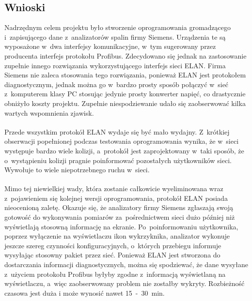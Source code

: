 \subsection{Wnioski}
Nadrzędnym celem projektu było stworzenie oprogramowania gromadzącego i~zapisującego dane z~analizatorów spalin firmy Siemens. Urządzenia te są wyposażone w~dwa interfejsy komunikacyjne, w~tym sugerowany przez producenta interfejs protokołu Profibus. Zdecydowano się jednak na zastosowanie zupełnie innego rozwiązania wykorzystującego interfejs sieci ELAN. Firma Siemens nie zaleca stosowania tego rozwiązania, ponieważ ELAN jest protokołem diagnostycznym, jednak można go w~bardzo prosty sposób połączyć w~sieć z~komputerem klasy PC stosując jedynie prosty konwerter napięć, co drastycznie obniżyło koszty projektu. Zupełnie niespodziewanie udało się zaobserwować kilka wartych wspomnienia zjawisk.
\\ \\
Przede wszystkim protokół ELAN wydaje się być mało wydajny. Z~krótkiej obserwacji popełnionej podczas testowania oprogramowania wynika, że w~sieci występuje bardzo wiele kolizji, a~protokół jest zaprojektowany w~taki sposób, że o~wystąpieniu kolizji pragnie poinformować pozostałych użytkowników sieci. Wywołuje to wiele niepotrzebnego ruchu w~sieci.
\\ \\
Mimo tej niewielkiej wady, która zostanie całkowicie wyeliminowana wraz z~pojawieniem się kolejnej wersji oprogramowania, protokół ELAN posiada nieocenioną zaletę. Okazuje się, że analizatory firmy Siemens zgłaszają swoją gotowość do wykonywania pomiarów za~pośrednictwem sieci dużo później niż wyświetlają stosowną informację na ekranie. Po~poinformowaniu użytkownika, poprzez wyłączenie na wyświetlaczu ikon wykrzyknika, analizator wykonuje jeszcze szereg czynności konfiguracyjnych, o~których przebiegu informuje wysyłając stosowny pakiet przez sieć. Ponieważ ELAN jest stworzona do dostarczania informacji diagnostycznych, można się spodziewać, że dane wysyłane z~użyciem protokołu Profibus byłyby zgodne z~informacją wyświetlaną na wyświetlaczu, a~więc zaobserwowany problem nie zostałby wykryty. Rozbieżność czasowa jest duża i może wynosić nawet 15~-~30~min.
